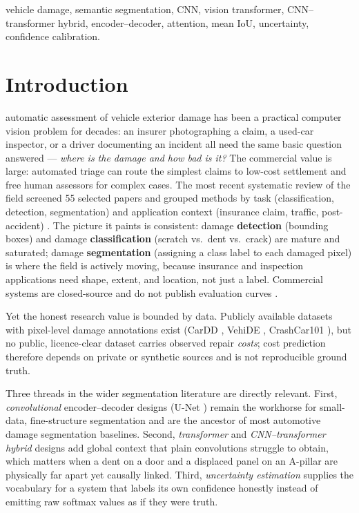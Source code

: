 \documentclass[conference]{IEEEtran}
\begin{document}
\begin{IEEEkeywords}
vehicle damage, semantic segmentation, CNN, vision transformer, CNN--transformer
hybrid, encoder--decoder, attention, mean IoU, uncertainty, confidence
calibration.
\end{IEEEkeywords}

\section{Introduction}
 automatic assessment of vehicle exterior damage has been a
practical computer vision problem for decades: an insurer photographing a claim,
a used-car inspector, or a driver documenting an incident all need the same
basic question answered --- \emph{where is the damage and how bad is it?} The
commercial value is large: automated triage can route the simplest claims to
low-cost settlement and free human assessors for complex cases. The most recent
systematic review of the field screened 55 selected papers and grouped methods
by task (classification, detection, segmentation) and application context
(insurance claim, traffic, post-accident) \cite{hasan2025}. The picture it
paints is consistent: damage \textbf{detection} (bounding boxes) and damage
\textbf{classification} (scratch vs.\ dent vs.\ crack) are mature and saturated;
damage \textbf{segmentation} (assigning a class label to each damaged pixel) is
where the field is actively moving, because insurance and inspection applications
need shape, extent, and location, not just a label. Commercial systems are
closed-source and do not publish evaluation curves \cite{hasan2025}.

Yet the honest research value is bounded by data. Publicly available datasets
with pixel-level damage annotations exist (CarDD \cite{cardd2023}, VehiDE
\cite{vehide2023}, CrashCar101 \cite{crashcar101}), but no public, licence-clear
dataset carries observed repair \emph{costs}; cost prediction therefore depends
on private or synthetic sources and is not reproducible ground truth.

Three threads in the wider segmentation literature are directly relevant.
First, \emph{convolutional} encoder--decoder designs (U-Net \cite{unet2015})
remain the workhorse for small-data, fine-structure segmentation and are the
ancestor of most automotive damage segmentation baselines. Second,
\emph{transformer} and \emph{CNN--transformer hybrid} designs
\cite{vit2021,setr2021,segformer2021,transunet2021,swin2021} add global context
that plain convolutions struggle to obtain, which matters when a dent on a door
and a displaced panel on an A-pillar are physically far apart yet causally
linked. Third, \emph{uncertainty estimation} \cite{kendall2017,mcdropout2016,
deepensembles2017} supplies the vocabulary for a system that labels its own
confidence honestly instead of emitting raw softmax values as if they were
truth.
\end{document}
